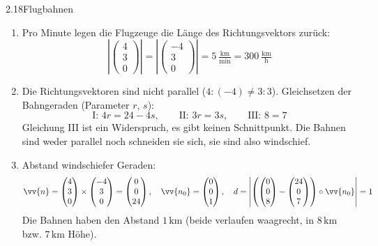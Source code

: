 \begin{loesung}{2.18}{Flugbahnen}
\begin{enumerate}[label=\alph*)]
  \item Pro Minute legen die Flugzeuge die Länge des Richtungsvektors zurück:
  \[\left|\begin{pmatrix} 4\\ 3\\ 0\end{pmatrix}\right| = \left|\begin{pmatrix} -4\\ 3\\ 0\end{pmatrix}\right| = 5\ \tfrac{\text{km}}{\text{min}} = 300\ \tfrac{\text{km}}{\text{h}}\]
  \item Die Richtungsvektoren sind nicht parallel ($4:(-4)\neq 3:3$). Gleichsetzen der Bahngeraden (Parameter $r$, $s$):
  \[\text{I: } 4r = 24-4s,\qquad\text{II: } 3r = 3s,\qquad\text{III: } 8 = 7\]
  Gleichung III ist ein Widerspruch, es gibt keinen Schnittpunkt. Die Bahnen sind weder parallel noch schneiden sie sich, sie sind also windschief.
  \item Abstand windschiefer Geraden:
  \[\vv{n} = \begin{pmatrix} 4\\ 3\\ 0\end{pmatrix}\times\begin{pmatrix} -4\\ 3\\ 0\end{pmatrix} = \begin{pmatrix} 0\\ 0\\ 24\end{pmatrix},\quad\vv{n_0} = \begin{pmatrix} 0\\ 0\\ 1\end{pmatrix},\quad d = \left|\left(\begin{pmatrix} 0\\ 0\\ 8\end{pmatrix}-\begin{pmatrix} 24\\ 0\\ 7\end{pmatrix}\right)\circ\vv{n_0}\right| = 1\]
  Die Bahnen haben den Abstand $1\,\text{km}$ (beide verlaufen waagrecht, in $8\,\text{km}$ bzw. $7\,\text{km}$ Höhe).

\end{enumerate}
\end{loesung}
